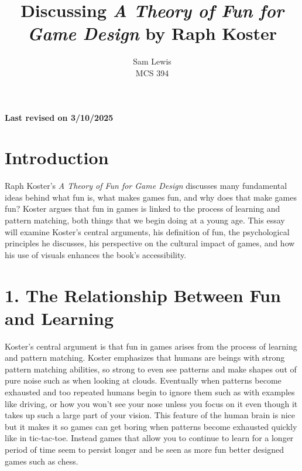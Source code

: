 \documentclass[12pt]{article}
\theoremstyle{definition}
\newcommand\rev[1]{\noindent\textbf{Last revised on {#1}}\\}
\begin{document}

\title{Discussing \textit{A Theory of Fun for Game Design} by Raph Koster} %
\author{Sam Lewis\\ %
MCS 394\\ %
}

\maketitle
\rev{3/10/2025} %


\section*{Introduction}
Raph Koster’s \textit{A Theory of Fun for Game Design} discusses many fundamental ideas behind what fun is, what makes games fun, and why does that make games fun? Koster argues that fun in games is linked to the process of learning and pattern matching, both things that we begin doing at a young age. This essay will examine Koster’s central arguments, his definition of fun, the psychological principles he discusses, his perspective on the cultural impact of games, and how his use of visuals enhances the book’s accessibility.

\section*{1. The Relationship Between Fun and Learning}
Koster’s central argument is that fun in games arises from the process of learning and pattern matching. Koster emphasizes that humans are beings with strong pattern matching abilities, so strong to even see patterns and make shapes out of pure noise such as when looking at clouds. Eventually when patterns become exhausted and too repeated humans begin to ignore them such as with examples like driving, or how you won't see your nose unless you focus on it even though it takes up such a large part of your vision. This feature of the human brain is nice but it makes it so games can get boring when patterns become exhausted quickly like in tic-tac-toe. Instead games that allow you to continue to learn for a longer period of time seem to persist longer and be seen as more fun better designed games such as chess.
\end{document}
